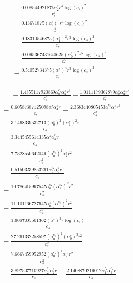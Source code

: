 \documentclass[10pt]{article}
\begin{document}
\begin{align*}
&{}  - \frac{0.008544921875 \alpha_{2}^s r^{4} \log{\left(c_{s} \right)}^{2}}{c_{s}^{4}} \\
&{}  - \frac{0.13671875 \left(\alpha_{0}^s\right)^{3} r^{4} \log{\left(c_{s} \right)}^{2}}{c_{s}^{4}} \\
&{}  - \frac{0.18310546875 \left(\alpha_{1}^s\right)^{2} r^{3} \log{\left(c_{s} \right)}^{2}}{c_{s}^{3}} \\
&{}  - \frac{0.0095367431640625 \left(\alpha_{0}^s\right)^{2} r^{5} \log{\left(c_{s} \right)}^{2}}{c_{s}^{5}} \\
&{}  - \frac{0.54052734375 \left(\alpha_{0}^s\right)^{4} r^{3} \log{\left(c_{s} \right)}^{2}}{c_{s}^{3}}
\end{align*}

\begin{align*}
\phantom{R_{3,7}} &\phantom{={}}{}  - \frac{1.4855117920869 \alpha_{0}^{c_s} \alpha_{2}^s r^{3}}{c_{s}^{3}} - \frac{1.0111179362879 \alpha_{0}^s \alpha_{2}^s r^{3}}{c_{s}^{3}} \\
&{}  - \frac{0.60587387125098 \alpha_{0}^s \alpha_{4}^s r}{c_{s}} - \frac{2.3683440805453 \alpha_{1}^{c_s} \alpha_{1}^s r^{3}}{c_{s}^{3}} \\
&{}  - \frac{3.1468339532713 \left(\alpha_{0}^s\right)^{2} \left(\alpha_{1}^s\right)^{2} r}{c_{s}} \\
&{}  - \frac{3.3445455614335 \alpha_{1}^s \alpha_{3}^{c_s} r}{c_{s}} \\
&{}  - \frac{7.7328550642049 \left(\alpha_{0}^{c_s}\right)^{2} \alpha_{2}^s r^{2}}{c_{s}^{2}} \\
&{}  - \frac{0.51503239853261 \alpha_{0}^{c_s} \alpha_{0}^s r^{5}}{c_{s}^{5}} \\
&{}  - \frac{10.786415997547 \alpha_{0}^{c_s} \left(\alpha_{1}^{c_s}\right)^{2} r^{2}}{c_{s}^{2}} \\
&{}  - \frac{11.101166727647 \alpha_{0}^s \left(\alpha_{1}^{c_s}\right)^{2} r^{2}}{c_{s}^{2}} \\
&{}  - \frac{1.6087005501362 \left(\alpha_{1}^s\right)^{3} r \log{\left(c_{s} \right)}}{c_{s}} \\
&{}  - \frac{27.261332258597 \left(\alpha_{0}^{c_s}\right)^{2} \left(\alpha_{0}^s\right)^{3} r^{2}}{c_{s}^{2}} \\
&{}  - \frac{7.6667459952952 \left(\alpha_{0}^{c_s}\right)^{2} \alpha_{2}^{c_s} r^{2}}{c_{s}^{2}} \\
&{}  - \frac{3.897507710927 \alpha_{2}^{c_s} \alpha_{2}^s r}{c_{s}} - \frac{2.1408870219012 \alpha_{1}^{c_s} \alpha_{3}^{c_s} r}{c_{s}} \\

\end{align*}
\end{document}
